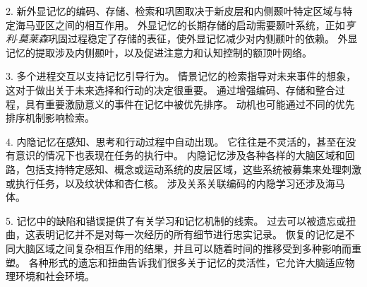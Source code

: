 2. 新外显记忆的编码、存储、检索和巩固取决于新皮层和内侧颞叶特定区域与特定海马亚区之间的相互作用。
外显记忆的长期存储的启动需要颞叶系统，正如\textit{亨利$\cdot$莫莱森}巩固过程稳定了存储的表征，使外显记忆减少对内侧颞叶的依赖。
外显记忆的提取涉及内侧颞叶，以及促进注意力和认知控制的额顶叶网络。


3. 多个进程交互以支持记忆引导行为。
情景记忆的检索指导对未来事件的想象，这对于做出关于未来选择和行动的决定很重要。
通过增强编码、存储和整合过程，具有重要激励意义的事件在记忆中被优先排序。
动机也可能通过不同的优先排序机制影响检索。 


4. 内隐记忆在感知、思考和行动过程中自动出现。
它往往是不灵活的，甚至在没有意识的情况下也表现在任务的执行中。
内隐记忆涉及各种各样的大脑区域和回路，包括支持特定感知、概念或运动系统的皮层区域，这些系统被募集来处理刺激或执行任务，以及纹状体和杏仁核。
涉及关系关联编码的内隐学习还涉及海马体。


5. 记忆中的缺陷和错误提供了有关学习和记忆机制的线索。
过去可以被遗忘或扭曲，这表明记忆并不是对每一次经历的所有细节进行忠实记录。
恢复的记忆是不同大脑区域之间复杂相互作用的结果，并且可以随着时间的推移受到多种影响而重塑。
各种形式的遗忘和扭曲告诉我们很多关于记忆的灵活性，它允许大脑适应物理环境和社会环境。


